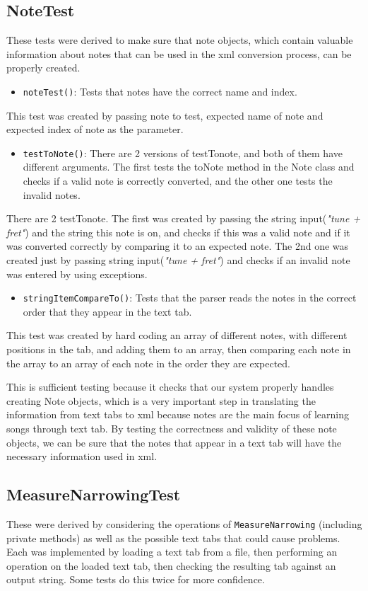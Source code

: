 \documentclass[11pt]{article}
\begin{document}
\subsection{NoteTest}
\label{sec:orgb48d59d}
These tests were derived to make sure that note objects, which contain valuable information about notes that can be used in the xml conversion process, can be properly created. 
\begin{itemize}
\item \texttt{noteTest()}: Tests that notes have the correct name and index.
\end{itemize}
This test was created by passing note to test, expected name of note and expected index of note as the parameter.
\begin{itemize}
\item \texttt{testToNote()}: There are 2 versions of testTonote, and both of them have different arguments. The first tests the toNote method in the Note class and checks if a valid note is correctly converted, and the other one tests the invalid notes.
\end{itemize}
There are 2 testTonote. The first was created by passing the string input(\emph{"tune + fret"}) and the string this note is on, and checks if this was a valid note and if it was converted correctly by comparing it to an expected note. The 2nd one was created just by passing string input(\emph{"tune + fret"}) and checks if an invalid note was entered by using exceptions.
\begin{itemize}
\item \texttt{stringItemCompareTo()}: Tests that the parser reads the notes in the correct order that they appear in the text tab.
\end{itemize}
This test was created by hard coding an array of different notes, with different positions in the tab, and adding them to an array, then comparing each note in the array to an array of each note in the order they are expected.

This is sufficient testing because it checks that our system properly handles creating Note objects, which is a very important step in translating the information from text tabs to xml because notes are the main focus of learning songs through text tab. By testing the correctness and validity of these note objects, we can be sure that the notes that appear in a text tab will have the necessary information used in xml.

\subsection{MeasureNarrowingTest}
\label{sec:org2ad888e}
These were derived by considering the operations of \texttt{MeasureNarrowing} (including private methods) as well as the possible text tabs that could cause problems.
Each was implemented by loading a text tab from a file, then performing an operation on the loaded text tab, then checking the resulting tab against an output string.  Some tests do this twice for more confidence.
\end{document}
